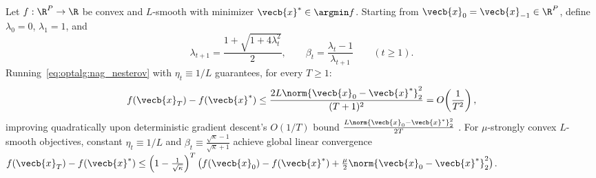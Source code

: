 \documentclass[../../../../master.tex]{subfiles}
\begin{document}
\begin{coremath}
\label{thm:optalg:nag_rate}
Let $f : \R^P \to \R$ be convex and $L$-smooth with minimizer $\vecb{x}^* \in \argmin f$. Starting from $\vecb{x}_0 = \vecb{x}_{-1} \in \R^P$, define $\lambda_0 = 0$, $\lambda_1 = 1$, and
\begin{equation}
\label{eq:optalg:nag_seq}
  \lambda_{t+1} = \frac{1 + \sqrt{1 + 4\lambda_t^2}}{2}, \qquad \beta_t = \frac{\lambda_t - 1}{\lambda_{t+1}} \qquad (t \ge 1).
\end{equation}
Running~\eqref{eq:optalg:nag_nesterov} with $\eta_t \equiv 1/L$ guarantees, for every $T \ge 1$:
\begin{equation}
\label{eq:optalg:nag_bound}
  f(\vecb{x}_T) - f(\vecb{x}^*) \le \frac{2L\norm{\vecb{x}_0 - \vecb{x}^*}_2^2}{(T + 1)^2} = O\!\left(\frac{1}{T^2}\right),
\end{equation}
improving quadratically upon deterministic gradient descent's $O(1/T)$ bound $\frac{L\norm{\vecb{x}_0-\vecb{x}^*}_2^2}{2T}$  . For $\mu$-strongly convex $L$-smooth objectives, constant $\eta_t \equiv 1/L$ and $\beta_t \equiv \frac{\sqrt{\kappa}-1}{\sqrt{\kappa}+1}$ achieve global linear convergence $f(\vecb{x}_T) - f(\vecb{x}^*) \le \left(1 - \frac{1}{\sqrt{\kappa}}\right)^T \bigl(f(\vecb{x}_0) - f(\vecb{x}^*) + \frac{\mu}{2}\norm{\vecb{x}_0 - \vecb{x}^*}_2^2\bigr)$.


\end{coremath}
\end{document}
